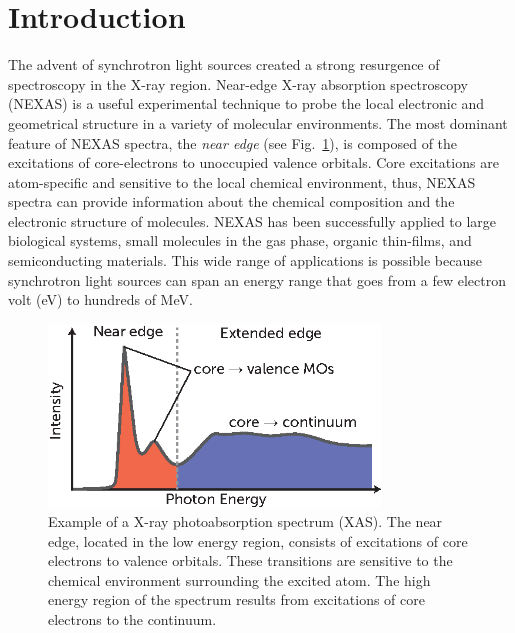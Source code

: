 \documentclass[8.5pt,twoside,twocolumn]{article}
\begin{document}
\section{Introduction}
The advent of synchrotron light sources created a strong resurgence of spectroscopy in the X-ray region. \cite{mcmillan_synchrotronproposed_1945} Near-edge X-ray absorption spectroscopy (NEXAS) is a useful experimental technique to probe the local electronic and geometrical structure in a variety of molecular environments.
The most dominant feature of NEXAS spectra, the \textit{near edge}  (see Fig.~\ref{fig:nexas-illustration}), is composed of the excitations of core-electrons to unoccupied valence orbitals.
Core excitations are atom-specific and sensitive to the local chemical environment, thus, NEXAS spectra can provide information about the chemical composition and the electronic structure of molecules.
NEXAS has been successfully applied to large biological systems, \cite{hua_refinement_2010} small molecules in the gas phase,\cite{contini_gas-phase_2001} organic thin-films,\cite{hahner_near_2006} and semiconducting materials.\cite{guo_electronic_2011} This wide range of applications is possible because synchrotron light sources can span an energy range that goes from a few electron volt (eV) \cite{feneberg_synchrotron-based_2011} to hundreds of MeV.\cite{nakazato_observation_1989}

\begin{figure}[!b]
\centering
\includegraphics[width=8.8cm]{figure_1.eps}
\caption{Example of a X-ray photoabsorption spectrum (XAS).  The near edge, located in the low energy region, consists of excitations of core electrons to valence orbitals.  These transitions are sensitive to the chemical environment surrounding the excited atom.  The high energy region of the spectrum results from excitations of core electrons to the continuum.}
\label{fig:nexas-illustration}
\end{figure}
\end{document}
